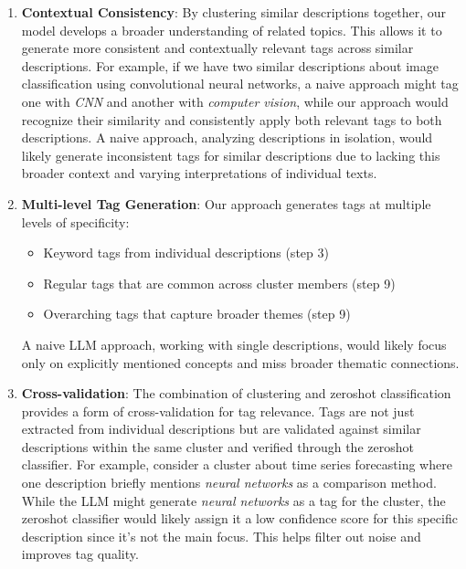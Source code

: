 \begin{enumerate}
    \item \textbf{Contextual Consistency}: By clustering similar descriptions together, our model develops a broader understanding of related topics. This allows it to generate more consistent and contextually relevant tags across similar descriptions. For example, if we have two similar descriptions about image classification using convolutional neural networks, a naive approach might tag one with \textit{CNN} and another with \textit{computer vision}, while our approach would recognize their similarity and consistently apply both relevant tags to both descriptions. A naive approach, analyzing descriptions in isolation, would likely generate inconsistent tags for similar descriptions due to lacking this broader context and varying interpretations of individual texts.
    
    \item \textbf{Multi-level Tag Generation}: Our approach generates tags at multiple levels of specificity:
    \begin{itemize}
        \item Keyword tags from individual descriptions (step 3)
        \item Regular tags that are common across cluster members (step 9)
        \item Overarching tags that capture broader themes (step 9)
    \end{itemize}
    A naive LLM approach, working with single descriptions, would likely focus only on explicitly mentioned concepts and miss broader thematic connections.
    
    \item \textbf{Cross-validation}: The combination of clustering and zeroshot classification provides a form of cross-validation for tag relevance. Tags are not just extracted from individual descriptions but are validated against similar descriptions within the same cluster and verified through the zeroshot classifier. For example, consider a cluster about time series forecasting where one description briefly mentions \textit{neural networks} as a comparison method. While the LLM might generate \textit{neural networks} as a tag for the cluster, the zeroshot classifier would likely assign it a low confidence score for this specific description since it's not the main focus. This helps filter out noise and improves tag quality. 
    

\end{enumerate}
